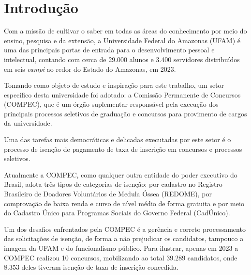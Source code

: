\documentclass[
	12pt,			%
	openright,		%
	oneside,	
	a4paper,		%
	english,		%
	brazil			%
]{abntex2/abntex2}  %
\begin{document}



	\tableofcontents*
	\cleardoublepage

	\textual

	\chapter{Introdução}
	
		Com a missão de cultivar o saber em todas as áreas do conhecimento por meio do ensino, pesquisa e da extensão, a Universidade Federal do Amazonas (UFAM) é uma das principais portas de entrada para o desenvolvimento pessoal e intelectual, contando com cerca de 29.000 alunos e 3.400 servidores distribuídos em seis \textit{campi} ao redor do Estado do Amazonas, em 2023.
		
		Tomando como objeto de estudo e inspiração para este trabalho, um setor específico desta universidade foi adotado: a Comissão Permanente de Concursos (COMPEC), que é um órgão suplementar responsável pela execução dos principais processos seletivos de graduação e concursos para provimento de cargos da universidade.
		
		Uma das tarefas mais democráticas e delicadas executadas por este setor é o processo de isenção de pagamento de taxa de inscrição em concursos e processos seletivos.
		
		Atualmente a COMPEC, como qualquer outra entidade do poder executivo do Brasil, adota três tipos de categorias de isenção: por cadastro no Registro Brasileiro de Doadores Voluntários de Medula Óssea (REDOME), por comprovação de baixa renda e curso de nível médio de forma gratuita e por meio do Cadastro Único para Programas Sociais do Governo Federal (CadÚnico).
		
		Um dos desafios enfrentados pela COMPEC é a gerência e correto processamento das solicitações de isenção, de forma a não prejudicar os candidatos, tampouco a imagem da UFAM e do funcionalismo público. Para ilustrar, apenas em 2023 a COMPEC realizou 10 concursos, mobilizando ao total 39.289 candidatos, onde 8.353 deles tiveram isenção de taxa de inscrição concedida.
		
\end{document}
